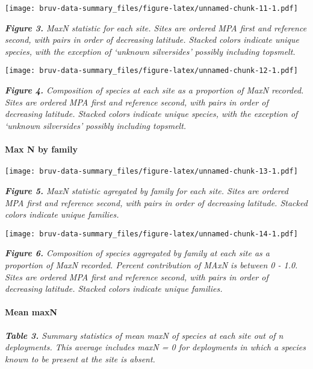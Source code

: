 \documentclass[]{article}
\let\oldparagraph\paragraph
\renewcommand{\paragraph}[1]{\oldparagraph{#1}\mbox{}}
\begin{document}
\texttt{[image: bruv-data-summary\_files/figure-latex/unnamed-chunk-11-1.pdf]}

\emph{\textbf{Figure 3.} MaxN statistic for each site. Sites are ordered
MPA first and reference second, with pairs in order of decreasing
latitude. Stacked colors indicate unique species, with the exception of
`unknown silversides' possibly including topsmelt.}

\texttt{[image: bruv-data-summary\_files/figure-latex/unnamed-chunk-12-1.pdf]}

\emph{\textbf{Figure 4.} Composition of species at each site as a
proportion of MaxN recorded. Sites are ordered MPA first and reference
second, with pairs in order of decreasing latitude. Stacked colors
indicate unique species, with the exception of `unknown silversides'
possibly including topsmelt.}

\paragraph{Max N by family}\label{max-n-by-family}

\texttt{[image: bruv-data-summary\_files/figure-latex/unnamed-chunk-13-1.pdf]}

\emph{\textbf{Figure 5. } MaxN statistic agregated by family for each
site. Sites are ordered MPA first and reference second, with pairs in
order of decreasing latitude. Stacked colors indicate unique families.}

\texttt{[image: bruv-data-summary\_files/figure-latex/unnamed-chunk-14-1.pdf]}

\emph{\textbf{Figure 6.} Composition of species aggregated by family at
each site as a proportion of MaxN recorded. Percent contribution of MAxN
is between 0 - 1.0. Sites are ordered MPA first and reference second,
with pairs in order of decreasing latitude. Stacked colors indicate
unique families.}

\paragraph{Mean maxN}\label{mean-maxn}

\emph{\textbf{Table 3.} Summary statistics of mean maxN of species at
each site out of n deployments. This average includes maxN = 0 for
deployments in which a species known to be present at the site is
absent.}
\end{document}
